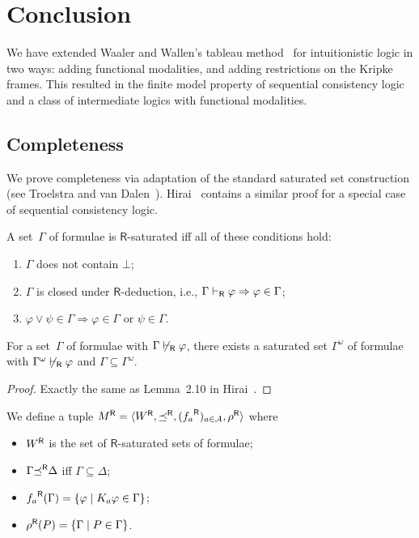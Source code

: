  \section{Conclusion}

 We have extended Waaler and Wallen's tableau method~\cite{waaler1999tableaux} for intuitionistic
 logic in two ways: adding functional modalities, and adding restrictions on the Kripke frames.
 This resulted in the finite model property of sequential consistency
 logic~\cite{hirailpar} and a class of intermediate logics with
 functional modalities.

  \subsection{Completeness}
  We prove completeness via
  adaptation of the standard saturated set construction (see Troelstra
  and van Dalen~\cite[Ch.~2]{troelstra1988constructivism}).
  Hirai~\cite{hirailpar} contains a similar proof for a special case of
  sequential consistency logic.

  \begin{definition}
   A set~$\Gamma$ of formulae is
   $\mathsf R$-saturated iff all of these conditions hold:
   \begin{enumerate}
    \item $\Gamma$ does not contain $\bot$;
    \item $\Gamma$ is closed under $\mathsf R$-deduction, i.e.,
	  $\Gamma\vdash_{\mathsf R}\varphi\Rightarrow\varphi\in\Gamma$;
    \item $\varphi\vee\psi\in\Gamma\Rightarrow\varphi\in\Gamma$ or $\psi\in\Gamma$.
   \end{enumerate}
  \end{definition}

  \begin{lemma}
   \label{hoe:saturation}
   For a set~$\Gamma$ of formulae with $\Gamma\not\vdash_{\mathsf R}\varphi$,
   there exists a
   saturated set $\Gamma^{\omega}$ of formulae with
   $\Gamma^{\omega}\not\vdash_{\mathsf R}\varphi$ and
   $\Gamma\subseteq \Gamma^{\omega}$.
  \end{lemma}
  \begin{proof}
   Exactly the same as Lemma~2.10 in Hirai~\cite{hirailpar}.
  \end{proof}


  \begin{definition}
   We define a tuple
   ${M}^{\mathsf R} = \langle{{W}^{\mathsf R}, {\preceq}^{\mathsf R}, ({f_a}^{\mathsf R})_{a\in \mathcal A}, {\rho}^{\mathsf R}}\rangle$
   where
   \begin{itemize}
    \item ${W}^{\mathsf R}$ is the set of $\mathsf R$-saturated sets of formulae;
    \item $\Gamma{\preceq}^{\mathsf R} \Delta$ iff $\Gamma\subseteq\Delta$;
    \item ${f_a}^{\mathsf R}(\Gamma) = \{\varphi\mid K_a\varphi\in\Gamma\}$;
    \item ${\rho}^{\mathsf R}(P)=\{\Gamma\mid P\in \Gamma\}$.
   \end{itemize}
  \end{definition}

